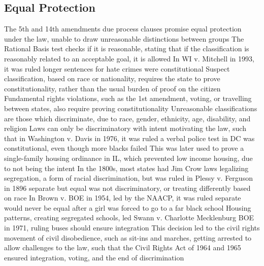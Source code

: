 \documentclass[11 pt, twoside]{article}
\newenvironment{outline*}
{
	\begin{outline}[enumerate]
	}
	{\end{outline}
}
\begin{document}
\subsection{Equal Protection}
\begin{outline*}
\1 The 5th and 14th amendments due process clauses promise equal protection under the law, unable to draw unreasonable distinctions between groups
\2 The Rational Basis test checks if it is reasonable, stating that if the classification is reasonably related to an acceptable goal, it is allowed
\2 In WI v. Mitchell in 1993, it was ruled longer sentences for hate crimes were constitutional
\2 Suspect classification, based on race or nationality, requires the state to prove constitutionality, rather than the usual burden of proof on the citizen
\2 Fundamental rights violations, such as the 1st amendment, voting, or travelling between states, also require proving constitutionality
\1 Unreasonable classifications are those which discriminate, due to race, gender, ethnicity, age, disability, and religion
\2 Laws can only be discriminatory with intent motivating the law, such that in Washington v. Davis in 1976, it was ruled a verbal police test in DC was constitutional, even though more blacks failed
\2 This was later used to prove a single-family housing ordinance in IL, which prevented low income housing, due to not being the intent
\1 In the 1800s, most states had Jim Crow laws legalizing segregation, a form of racial discrimination, but was ruled in Plessy v. Ferguson in 1896 separate but equal was not discriminatory, or treating differently based on race
\2 In Brown v. BOE in 1954, led by the NAACP, it was ruled separate would never be equal after a girl was forced to go to a far black school
\2 Housing patterns, creating segregated schools, led Swann v. Charlotte Mecklenburg BOE in 1971, ruling buses should ensure integration
\2 This decision led to the civil rights movement of civil disobedience, such as sit-ins and marches, getting arrested to allow challenges to the law, such that the Civil Rights Act of 1964 and 1965 ensured integration, voting, and the end of discrimination
\end{outline*}
\end{document}
